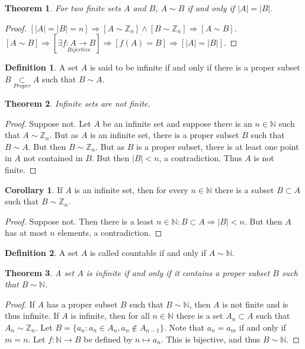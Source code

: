 \documentclass[oneside]{book}
\newtheorem{theorem}{Theorem}[section]
\theoremstyle{definition}
\newtheorem{definition}{Definition}[section]
\newtheorem{corollary}{Corollary}[section]
\begin{document}
\begin{theorem}
For two finite sets $A$ and $B$, $A\sim B$ if and only if $|A|=|B|$.
\end{theorem}
\begin{proof}
$[|A|=|B|=n]\Rightarrow[A\sim \mathbb{Z}_n]\land[B\sim \mathbb{Z}_n]\Rightarrow [A\sim B]$. $[A\sim B]\Rightarrow [\exists \underset{Bijective}{f:A\rightarrow B}]\Rightarrow [f(A) = B]\Rightarrow [|A|=|B|]$.
\end{proof}

\begin{definition}
A set $A$ is said to be infinite if and only if there is a proper subset $B\underset{Proper}\subset A$ such that $B\sim A$.
\end{definition}

\begin{theorem}
Infinite sets are not finite.
\end{theorem}
\begin{proof}
Suppose not. Let $A$ be an infinite set and suppose there is an $n\in \mathbb{N}$ such that $A\sim \mathbb{Z}_n$. But as $A$ is an infinite set, there is a proper subset $B$ such that $B\sim A$. But then $B\sim \mathbb{Z}_n$. But as $B$ is a proper subset, there is at least one point in $A$ not contained in $B$. But then $|B|<n$, a contradiction. Thus $A$ is not finite.
\end{proof}

\begin{corollary}
If $A$ is an infinite set, then for every $n\in \mathbb{N}$ there is a subset $B\subset A$ such that $B\sim \mathbb{Z}_n$.
\end{corollary}
\begin{proof}
Suppose not. Then there is a least $n\in \mathbb{N}:B\subset A\Rightarrow |B|<n$. But then $A$ has at most $n$ elements, a contradiction.
\end{proof}

\begin{definition}
A set $A$ is called countable if and only if $A\sim \mathbb{N}$.
\end{definition}

\begin{theorem}
A set $A$ is infinite if and only if it contains a proper subset $B$ such that $B\sim \mathbb{N}$.
\end{theorem}
\begin{proof}
If $A$ has a proper subset $B$ such that $B\sim \mathbb{N}$, then $A$ is not finite and is thus infinite. If $A$ is infinite, then for all $n\in \mathbb{N}$ there is a set $A_n\subset A$ such that $A_n \sim \mathbb{Z}_n$. Let $B = \{a_n: a_n \in A_n, a_n \notin A_{n-1}\}$. Note that $a_{n} = a_{m}$ if and only if $m= n$. Let $f:\mathbb{N} \rightarrow B$ be defined by $n\mapsto a_n$. This is bijective, and thus $B\sim \mathbb{N}$.
\end{proof}
\end{document}
